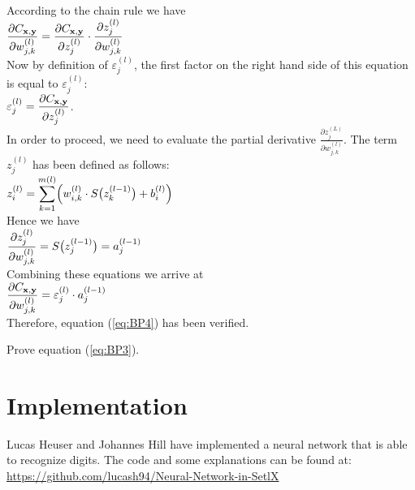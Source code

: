 According to the chain rule we have
\\[0.2cm]
\hspace*{1.3cm}
$ \displaystyle\frac{\partial C_{\mathbf{x}, \mathbf{y}}}{\partial w_{j,k}^{(l)}}  =  
  \frac{\partial C_{\mathbf{x}, \mathbf{y}}}{\partial z_j^{(l)}} \cdot \frac{\partial z_j^{(l)}}{\partial w_{j,k}^{(l)}} 
$ 
\\[0.2cm]
Now by definition of $\varepsilon_j^{(l)}$, the first factor on the right hand side of this equation is equal to $\varepsilon_j^{(l)}$: 
\\[0.2cm]
\hspace*{1.3cm}
$\displaystyle \varepsilon_j^{(l)} = \frac{\partial C_{\mathbf{x}, \mathbf{y}}}{\partial z_j^{(l)}}$.
\\[0.2cm]
In order to proceed, we need to evaluate the partial derivative
$\frac{\partial z_j^{(L)}}{\partial w_{j,k}^{(l)}}$.  The term $z_j^{(l)}$ has been defined as follows:
\\[0.2cm]
\hspace*{1.3cm}
$\displaystyle z_i^{(l)} = \sum\limits_{k=1}^{m(l)} \Bigl(w_{i,k}^{(l)} \cdot S\bigl(z_k^{(l-1)}\bigr) + b_i^{(l)}\Bigr)$
\\[0.2cm]
Hence we have
\\[0.2cm]
\hspace*{1.3cm}
$\displaystyle\frac{\partial z_j^{(l)}}{\partial w_{j,k}^{(l)}} = S\bigl(z_j^{(l-1)}\bigr) = a_j^{(l-1)}$ 
\\[0.2cm]
Combining these equations we arrive at
\\[0.2cm]
\hspace*{1.3cm}
$ \displaystyle\frac{\partial C_{\mathbf{x}, \mathbf{y}}}{\partial w_{j,k}^{(l)}}  =  
  \varepsilon_j^{(l)} \cdot a_j^{(l-1)}
$ 
\\[0.2cm]
Therefore, equation (\ref{eq:BP4}) has been verified.

\exercise
Prove equation (\ref{eq:BP3}).
\eoxs

\section{Implementation}
Lucas Heuser and Johannes Hill have implemented a neural network that is able to recognize digits. 
The code and some explanations can be found at:
\\[0.2cm]
\hspace*{1.3cm}
\href{https://github.com/lucash94/Neural-Network-in-SetlX}{https://github.com/lucash94/Neural-Network-in-SetlX}
\\[0.2cm]



